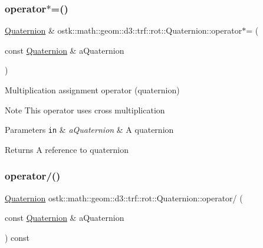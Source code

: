 \subsubsection{\texorpdfstring{operator$\ast$=()}{operator*=()}}
{\footnotesize\ttfamily \hyperlink{classostk_1_1math_1_1geom_1_1d3_1_1trf_1_1rot_1_1_quaternion}{Quaternion} \& ostk\+::math\+::geom\+::d3\+::trf\+::rot\+::\+Quaternion\+::operator$\ast$= (\begin{DoxyParamCaption}\item[{const \hyperlink{classostk_1_1math_1_1geom_1_1d3_1_1trf_1_1rot_1_1_quaternion}{Quaternion} \&}]{a\+Quaternion }\end{DoxyParamCaption})}



Multiplication assignment operator (quaternion) 

\begin{DoxyNote}{Note}
This operator uses cross multiplication
\end{DoxyNote}

\begin{DoxyParams}[1]{Parameters}
\mbox{\tt in}  & {\em a\+Quaternion} & A quaternion \\
\hline
\end{DoxyParams}
\begin{DoxyReturn}{Returns}
A reference to quaternion 
\end{DoxyReturn}
\mbox{\label{classostk_1_1math_1_1geom_1_1d3_1_1trf_1_1rot_1_1_quaternion_a6f99e31b1d9a0423b90ae83d79847ad4}} 
\subsubsection{\texorpdfstring{operator/()}{operator/()}}
{\footnotesize\ttfamily \hyperlink{classostk_1_1math_1_1geom_1_1d3_1_1trf_1_1rot_1_1_quaternion}{Quaternion} ostk\+::math\+::geom\+::d3\+::trf\+::rot\+::\+Quaternion\+::operator/ (\begin{DoxyParamCaption}\item[{const \hyperlink{classostk_1_1math_1_1geom_1_1d3_1_1trf_1_1rot_1_1_quaternion}{Quaternion} \&}]{a\+Quaternion }\end{DoxyParamCaption}) const}



